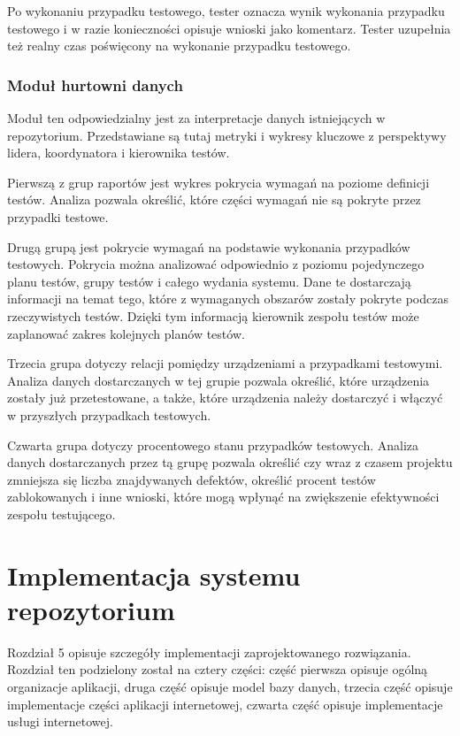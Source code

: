 Po wykonaniu przypadku testowego, tester oznacza wynik wykonania przypadku testowego i w razie konieczności opisuje wnioski jako komentarz. Tester uzupełnia też realny czas poświęcony na wykonanie przypadku testowego.

\subsection{ Moduł hurtowni danych  }

Moduł ten odpowiedzialny jest za interpretacje danych istniejących w repozytorium. Przedstawiane są tutaj metryki i wykresy kluczowe z perspektywy lidera, koordynatora i kierownika testów.

Pierwszą z grup raportów jest wykres pokrycia wymagań na poziome definicji testów. Analiza pozwala określić, które części wymagań nie są pokryte przez przypadki testowe.

Drugą grupą jest pokrycie wymagań na podstawie wykonania przypadków testowych. Pokrycia można analizować odpowiednio z poziomu pojedynczego planu testów, grupy testów i całego wydania systemu. Dane te dostarczają informacji na temat tego, które z wymaganych obszarów zostały pokryte podczas rzeczywistych testów. Dzięki tym informacją kierownik zespołu testów może zaplanować zakres kolejnych planów testów.

Trzecia grupa dotyczy relacji pomiędzy urządzeniami a przypadkami testowymi. Analiza danych dostarczanych w tej grupie pozwala określić, które urządzenia zostały już przetestowane, a także, które urządzenia należy dostarczyć i włączyć w przyszłych przypadkach testowych.

Czwarta grupa dotyczy procentowego stanu przypadków testowych. Analiza danych dostarczanych przez tą grupę pozwala określić czy wraz z czasem projektu zmniejsza się liczba znajdywanych defektów, określić procent testów zablokowanych i inne wnioski, które mogą wpłynąć na zwiększenie efektywności zespołu testującego.



\chapter{Implementacja systemu repozytorium}

Rozdział 5 opisuje szczegóły implementacji zaprojektowanego rozwiązania. Rozdział ten podzielony został na cztery części: część pierwsza opisuje ogólną organizacje aplikacji, druga część opisuje model bazy danych, trzecia część opisuje implementacje części aplikacji internetowej, czwarta część opisuje implementacje usługi internetowej.

